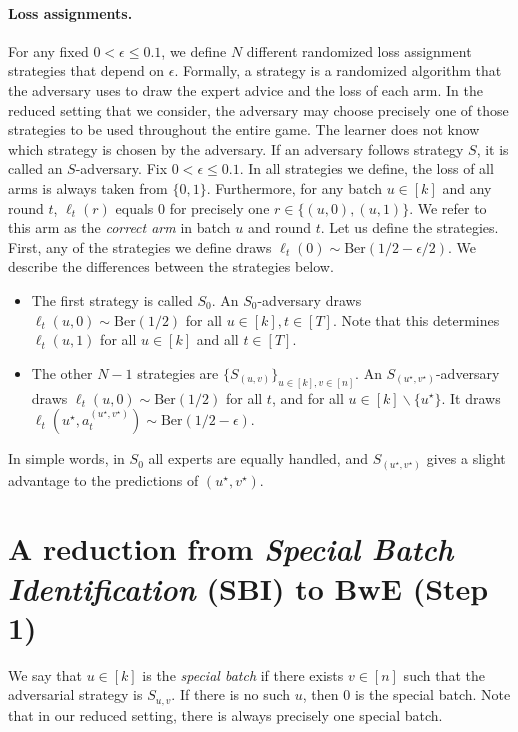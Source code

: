\documentclass[a4paper,11pt]{article}
\theoremstyle{definition}
\newcommand{\Ber}{\mathrm{Ber}}
\begin{document}
\paragraph{Loss assignments.}
For any fixed $0 < \epsilon \leq 0.1$, we define $N$ different randomized loss assignment strategies that depend on $\epsilon$. Formally, a strategy is a randomized algorithm that the adversary uses to draw the expert advice and the loss of each arm. In the reduced setting that we consider, the adversary may choose precisely one of those strategies to be used throughout the entire game. The learner does not know which strategy is chosen by the adversary. If an adversary follows strategy $S$, it is called an $S$-adversary.
Fix $0 < \epsilon \leq 0.1$. 
In all strategies we define, the loss of all arms is always taken from $\{0,1\}$. Furthermore, for any batch $u \in [k]$ and any round $t$, $\ell_t(r)$ equals $0$ for precisely one $r \in \{(u,0), (u,1)\}$. We refer to this arm as the \emph{correct arm} in  batch $u$ and round $t$.
Let us define the strategies. First, any of the strategies we define draws $\ell_t(0) \sim \Ber(1/2-\epsilon/2)$. We describe the differences between the strategies below.
\begin{itemize}
    \item The first strategy is called $S_0$. An $S_0$-adversary draws $\ell_t(u,0) \sim \Ber(1/2)$ for all $u \in [k],t \in [T]$. Note that this determines $\ell_t(u,1)$ for all $u \in [k]$ and all $t \in [T]$.
    \item The other $N-1$ strategies are $\{S_{(u,v)}\}_{u \in [k], v \in [n]}$. An $S_{(u^\star,v^\star)}$-adversary draws $\ell_t(u,0) \sim \Ber(1/2)$ for all $t$, and for all $u \in [k] \backslash \{u^\star\}$. It draws $\ell_t(u^\star,a_t^{(u^\star, v^\star)}) \sim \Ber(1/2-\epsilon)$.
\end{itemize}

In simple words, in $S_0$ all experts are equally handled, and $S_{(u^\star,v^\star)}$ gives a slight advantage to the predictions of $(u^\star,v^\star)$.

\section{A reduction from \emph{Special Batch Identification} (SBI) to BwE (Step 1)} \label{sec:reduction-step1}
We say that $u \in [k]$ is the \emph{special batch} if there exists $v \in [n]$ such that the adversarial strategy is $S_{u,v}$. If there is no such $u$, then $0$ is the special batch. Note that in our reduced setting, there is always precisely one special batch.
\end{document}
